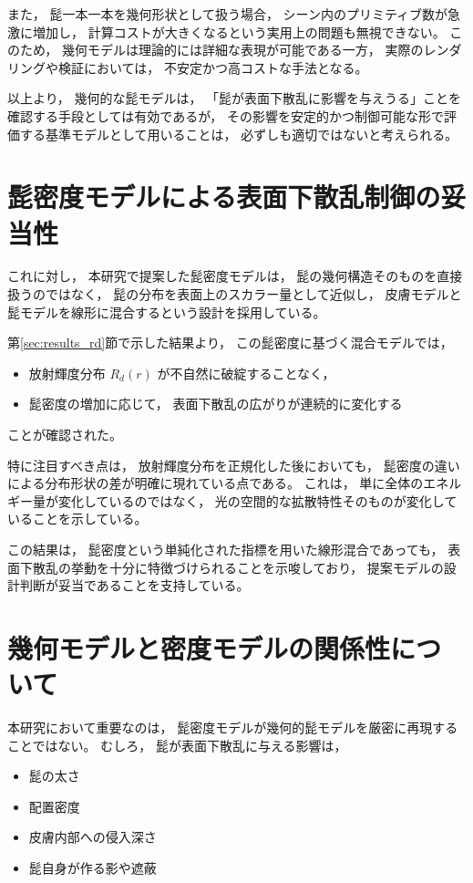 また，
髭一本一本を幾何形状として扱う場合，
シーン内のプリミティブ数が急激に増加し，
計算コストが大きくなるという実用上の問題も無視できない。
このため，
幾何モデルは理論的には詳細な表現が可能である一方，
実際のレンダリングや検証においては，
不安定かつ高コストな手法となる。

以上より，
幾何的な髭モデルは，
「髭が表面下散乱に影響を与えうる」ことを確認する手段としては有効であるが，
その影響を安定的かつ制御可能な形で評価する基準モデルとして用いることは，
必ずしも適切ではないと考えられる。

\section{髭密度モデルによる表面下散乱制御の妥当性}

これに対し，
本研究で提案した髭密度モデルは，
髭の幾何構造そのものを直接扱うのではなく，
髭の分布を表面上のスカラー量として近似し，
皮膚モデルと髭モデルを線形に混合するという設計を採用している。

第\ref{sec:results_rd}節で示した結果より，
この髭密度に基づく混合モデルでは，

\begin{itemize}
  \item 放射輝度分布 $R_d(r)$ が不自然に破綻することなく，
  \item 髭密度の増加に応じて，
        表面下散乱の広がりが連続的に変化する
\end{itemize}

ことが確認された。

特に注目すべき点は，
放射輝度分布を正規化した後においても，
髭密度の違いによる分布形状の差が明確に現れている点である。
これは，
単に全体のエネルギー量が変化しているのではなく，
光の空間的な拡散特性そのものが変化していることを示している。

この結果は，
髭密度という単純化された指標を用いた線形混合であっても，
表面下散乱の挙動を十分に特徴づけられることを示唆しており，
提案モデルの設計判断が妥当であることを支持している。

\section{幾何モデルと密度モデルの関係性について}

本研究において重要なのは，
髭密度モデルが幾何的髭モデルを厳密に再現することではない。
むしろ，
髭が表面下散乱に与える影響は，

\begin{itemize}
  \item 髭の太さ
  \item 配置密度
  \item 皮膚内部への侵入深さ
  \item 髭自身が作る影や遮蔽
\end{itemize}

